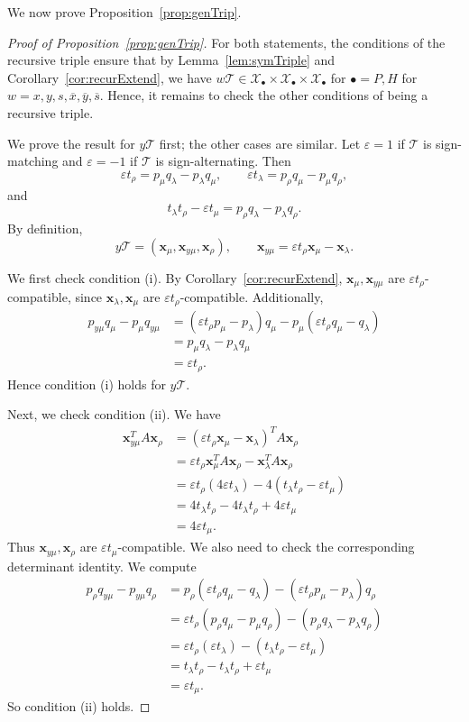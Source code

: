 \documentclass[11pt, reqno]{amsart}
\theoremstyle{remark}
\numberwithin{equation}{subsection}
\numberwithin{figure}{section}
\theoremstyle{customremark}
\newcommand{\Tt}{\mathcal{T}}
\newcommand{\ov}{\overline}
\newcommand{\eps}{\varepsilon}
\newcommand{\X}{\mathcal{X}}
\begin{document}
We now prove Proposition~\ref{prop:genTrip}.
  \begin{proof}[Proof of Proposition~\ref{prop:genTrip}]
    For both statements, the conditions of the recursive triple ensure that by Lemma~\ref{lem:symTriple} and Corollary~\ref{cor:recurExtend}, we have $w\Tt \in\X_\bullet \times\X_\bullet \times\X_\bullet$ for $\bullet=P,H$ for $w=x,y,s,\ov{x},\ov{y},\ov{s}.$ Hence, it remains to check the other conditions of being a recursive triple. 

 
     

We prove the result for $y\Tt$ first; the other cases are similar. Let $\eps=1$ if $\Tt$ is sign-matching and $\eps=-1$ if $\Tt$ is sign-alternating. Then
\[
\eps t_\rho=p_\mu q_\lambda-p_\lambda q_\mu,
\qquad
\eps t_\lambda=p_\rho q_\mu-p_\mu q_\rho,
\]
and
\[
t_\lambda t_\rho-\eps t_\mu=p_\rho q_\lambda-p_\lambda q_\rho.
\]
By definition,
\[
y\Tt=(\bm{x}_\mu,\bm{x}_{y\mu},\bm{x}_\rho),
\qquad
\bm{x}_{y\mu}=\eps t_\rho\bm{x}_\mu-\bm{x}_\lambda.
\]

We first check condition (i). By Corollary~\ref{cor:recurExtend}, $\bm{x}_\mu,\bm{x}_{y\mu}$ are $\eps t_\rho$-compatible, since $\bm{x}_\lambda,\bm{x}_\mu$ are $\eps t_\rho$-compatible. Additionally,
\begin{align*}
p_{y\mu}q_\mu-p_\mu q_{y\mu}
&=(\eps t_\rho p_\mu-p_\lambda)q_\mu
-p_\mu(\eps t_\rho q_\mu-q_\lambda)\\
&=p_\mu q_\lambda-p_\lambda q_\mu\\
&=\eps t_\rho.
\end{align*}
Hence condition (i) holds for $y\Tt$.

Next, we check condition (ii). We have
\begin{align*}
\bm{x}_{y\mu}^TA\bm{x}_\rho
&=(\eps t_\rho \bm{x}_\mu-\bm{x}_\lambda)^TA\bm{x}_\rho\\
&=\eps t_\rho \bm{x}_\mu^TA\bm{x}_\rho-\bm{x}_\lambda^TA\bm{x}_\rho\\
&=\eps t_\rho(4\eps t_\lambda)-4(t_\lambda t_\rho-\eps t_\mu)\\
&=4t_\lambda t_\rho-4t_\lambda t_\rho+4\eps t_\mu\\
&=4\eps t_\mu.
\end{align*}
Thus $\bm{x}_{y\mu},\bm{x}_\rho$ are $\eps t_\mu$-compatible. We also need to check the corresponding determinant identity. We compute
\begin{align*}
p_\rho q_{y\mu}-p_{y\mu}q_\rho
&=p_\rho(\eps t_\rho q_\mu-q_\lambda)
-(\eps t_\rho p_\mu-p_\lambda)q_\rho\\
&=\eps t_\rho(p_\rho q_\mu-p_\mu q_\rho)
-(p_\rho q_\lambda-p_\lambda q_\rho)\\
&=\eps t_\rho(\eps t_\lambda)
-(t_\lambda t_\rho-\eps t_\mu)\\
&=t_\lambda t_\rho-t_\lambda t_\rho+\eps t_\mu\\
&=\eps t_\mu.
\end{align*}
So condition (ii) holds.


\end{proof}
\end{document}
